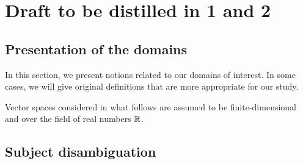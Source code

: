 \setcounter{chapter}{-1}
\chapter{Draft to be distilled in 1 and 2}

\minitoc
\newpage

\section{Presentation of the domains}

In this section, we present notions related to our domains of interest. In some cases, we will give original definitions that are more appropriate for our study.

Vector spaces considered in what follows are assumed to be finite-dimensional and over the field of real numbers $\mathbb{R}$.


\newpage

\newpage

\newpage

\section{Subject disambiguation}


\newpage